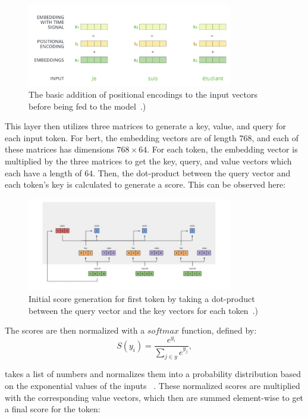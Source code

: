 \documentclass[12pt]{article}
\begin{document}
\begin{figure}[h]
\centering
\includegraphics[width=0.8\textwidth]{fig/positional_encodings.png}
\caption{The basic addition of positional encodings to the input vectors before being fed to the model~\parencite{alammar_2018}.)
}
\label{fig:positional_encodings}
\end{figure}

This layer then utilizes three matrices to generate a key, value, and query for each input token. For \acrshort{bert}, the embedding vectors are of length $768$, and each of these matrices has dimensions $768 \times 64$. For each token, the embedding vector is multiplied by the three matrices to get the key, query, and value vectors which each have a length of $64$. Then, the dot-product between the query vector and each token’s key is calculated to generate a score. This can be observed here:

\begin{figure}[h]
\centering
\includegraphics[width=0.8\textwidth]{fig/first_encoder_step.jpg}
\caption{Initial score generation for first token by taking a dot-product between the query vector and the key vectors for each token~\parencite{karim_2019}.)
}
\label{fig:first_encoder_step}
\end{figure}

The scores are then normalized with a $softmax$ function, defined by:
\begin{equation}
\label{eq:softmax}
S(y_i) = \frac{e^{y_i}}{\sum_{j\in y}e^{y_j}}, 
\end{equation}

 takes a list of numbers and normalizes them into a probability distribution based on the exponential values of the inputs ~\parencite{bengio_goodfellow_courville_2017}. These normalized scores are multiplied with the corresponding value vectors, which then are summed element-wise to get a final score for the token:
\end{document}
